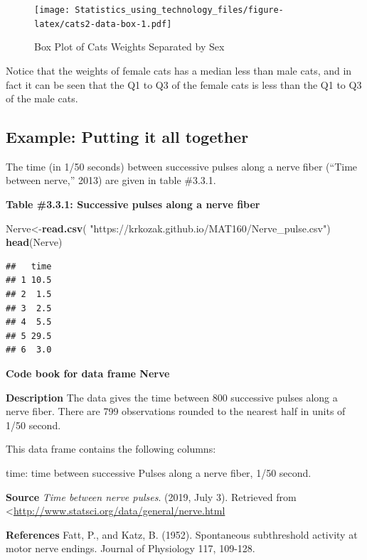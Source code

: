 \documentclass[
]{book}
\newenvironment{Shaded}{\begin{snugshade}}{\end{snugshade}}
\newcommand{\KeywordTok}[1]{\textcolor[rgb]{0.13,0.29,0.53}{\textbf{#1}}}
\newcommand{\NormalTok}[1]{#1}
\newcommand{\StringTok}[1]{\textcolor[rgb]{0.31,0.60,0.02}{#1}}
\begin{document}
\begin{figure}
\centering
\texttt{[image: Statistics\_using\_technology\_files/figure-latex/cats2-data-box-1.pdf]}
\caption{\label{fig:cats2-data-box}Box Plot of Cats Weights Separated by Sex}
\end{figure}

Notice that the weights of female cats has a median less than male cats, and in fact it can be seen that the Q1 to Q3 of the female cats is less than the Q1 to Q3 of the male cats.

\hypertarget{example-putting-it-all-together}{%
\subsection{Example: Putting it all together}\label{example-putting-it-all-together}}

The time (in 1/50 seconds) between successive pulses along a nerve fiber (``Time between nerve,'' 2013) are given in table \#3.3.1.

\textbf{Table \#3.3.1: Successive pulses along a nerve fiber}

\begin{Shaded}
\begin{Highlighting}[]
\NormalTok{Nerve<-}\KeywordTok{read.csv}\NormalTok{(}
  \StringTok{"https://krkozak.github.io/MAT160/Nerve_pulse.csv"}\NormalTok{)}
\KeywordTok{head}\NormalTok{(Nerve)}
\end{Highlighting}
\end{Shaded}

\begin{verbatim}
##   time
## 1 10.5
## 2  1.5
## 3  2.5
## 4  5.5
## 5 29.5
## 6  3.0
\end{verbatim}

\textbf{Code book for data frame Nerve}

\textbf{Description}
The data gives the time between 800 successive pulses along a nerve fiber. There are 799 observations rounded to the nearest half in units of 1/50 second.

This data frame contains the following columns:

time: time between successive Pulses along a nerve fiber, 1/50 second.

\textbf{Source}
\emph{Time between nerve pulses}. (2019, July 3). Retrieved from
\textless{}\url{http://www.statsci.org/data/general/nerve.html}

\textbf{References}
Fatt, P., and Katz, B. (1952). Spontaneous subthreshold activity at motor nerve endings. Journal of Physiology 117, 109-128.
\end{document}

